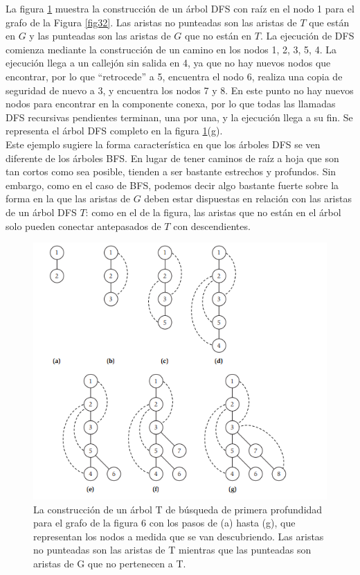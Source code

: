 \documentclass[a4paper, 12pt]{book}
\theoremstyle{dotless}
\begin{document}
La figura \ref{Fig35} muestra la construcción de un árbol DFS con raíz en el nodo 1 para el grafo de la Figura \ref{fig32}. Las aristas no punteadas son las aristas de $T$  que están en $G$ y las punteadas son las aristas de $G$ que no están en $T$. La ejecución de DFS comienza mediante la construcción de un camino en los nodos 1, 2, 3, 5, 4. La ejecución llega a un callejón sin salida en 4, ya que no hay nuevos nodos que encontrar, por lo que ``retrocede'' a 5, encuentra el nodo 6, realiza una copia de seguridad de nuevo a 3, y encuentra los nodos 7 y 8. En este punto no hay nuevos nodos para encontrar en la componente conexa, por lo que todas las llamadas DFS recursivas pendientes terminan, una por una, y la ejecución llega a su fin. Se representa el árbol DFS completo en la figura \ref{Fig35}(g).\\

Este ejemplo sugiere la forma característica en que los árboles DFS se ven
diferente de los árboles BFS. En lugar de tener caminos de raíz a hoja que son tan cortos como sea posible, tienden a ser bastante estrechos y profundos. Sin embargo, como en el caso de BFS, podemos decir algo bastante fuerte sobre la forma en la que
las aristas de $G$ deben estar dispuestas en relación con las aristas de un árbol DFS $T$: como en el de la figura, las aristas que no están en el árbol solo pueden conectar antepasados de $T$ con descendientes.

\begin{figure}[h]
\centering
\includegraphics[scale=1]{Imagenes-Seccion3/fig3_5.PNG}
\caption{La construcción de un árbol T de búsqueda de primera profundidad para el grafo de la figura 6 con los pasos de (a) hasta (g), que representan los nodos a medida que se van descubriendo. Las aristas no punteadas son las aristas de T mientras que las punteadas son aristas de G que no pertenecen a T.}
\label{Fig35}
\end{figure}
\end{document}
